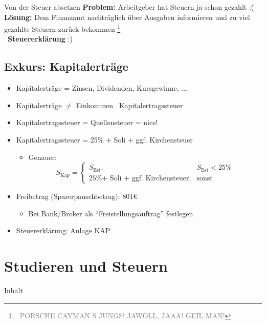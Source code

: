 \documentclass[draft]{beamer}
\newcommand{\n}{\hfill\\\vspace{0.25cm}}
\let\oldfootnote\footnote
\renewcommand{\footnote}[1]
{%
	\oldfootnote
	{
		\tiny
		\textcolor{gray}{\ #1}
	}%
}
\begin{document}
			\begin{frame}{Von der Steuer absetzen}
				\textbf{Problem:} Arbeitgeber hat Steuern ja schon gezahlt :(\n
				\textbf{Lösung:} Dem Finanzamt nachträglich über Ausgaben informieren und zu viel gezahlte Steuern zurück bekommen\footnote{PORSCHE CAYMAN S JUNGS! JAWOLL, JAAA! GEIL MAN!}\n
				\textrightarrow\ \textbf{Steuererklärung} :)
			\end{frame}
		
		\subsection{Exkurs: Kapitalerträge}
		
			\begin{frame}
				\begin{itemize}
					\item Kapitalerträge = Zinsen, Dividenden, Kursgewinne, ...
					\item Kapitalerträge $\neq$ Einkommen \textrightarrow\ Kapitalertragssteuer\pause
					\item Kapitalertragssteuer = Quellensteuer = nice!
					\item Kapitalertragssteuer = 25\% + Soli + ggf. Kirchensteuer
					\begin{itemize}
						\item Genauer:
						\[
							S_\text{Kap} =
							\begin{cases}
								S_\text{Est}, & S_{\text{Est}} < 25\%\\
								\text{25\% + Soli + ggf. Kirchensteuer}, & \text{sonst}
							\end{cases}
						\]
					\end{itemize}\pause
					\item Freibetrag (Sparerpauschbetrag): 801€
					\begin{itemize}
						\item Bei Bank/Broker als "`Freistellungsauftrag"' festlegen
					\end{itemize}
					\item Steuererklärung: Anlage KAP
				\end{itemize}
			\end{frame}
		
	\section{Studieren und Steuern}
	
		\begin{frame}[t]{Inhalt}
		\end{frame}
	
\end{document}
